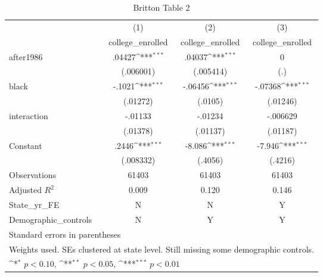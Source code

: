 \begin{table}[htbp]\centering
\def\sym#1{\ifmmode^{#1}\else\(^{#1}\)\fi}
\caption{Britton Table 2}
\begin{tabular}{l*{3}{c}}
\hline\hline
                    &\multicolumn{1}{c}{(1)}&\multicolumn{1}{c}{(2)}&\multicolumn{1}{c}{(3)}\\
                    &\multicolumn{1}{c}{college\_enrolled}&\multicolumn{1}{c}{college\_enrolled}&\multicolumn{1}{c}{college\_enrolled}\\
\hline
after1986           &      .04427\sym{***}&      .04037\sym{***}&           0         \\
                    &   (.006001)         &   (.005414)         &         (.)         \\
[1em]
black               &      -.1021\sym{***}&     -.06456\sym{***}&     -.07368\sym{***}\\
                    &    (.01272)         &     (.0105)         &    (.01246)         \\
[1em]
interaction         &     -.01133         &     -.01234         &    -.006629         \\
                    &    (.01378)         &    (.01137)         &    (.01187)         \\
[1em]
Constant            &       .2446\sym{***}&      -8.086\sym{***}&      -7.946\sym{***}\\
                    &   (.008332)         &     (.4056)         &     (.4216)         \\
\hline
Observations        &       61403         &       61403         &       61403         \\
Adjusted \(R^{2}\)  &       0.009         &       0.120         &       0.146         \\
State\_yr\_FE         &           N         &           N         &           Y         \\
Demographic\_controls&           N         &           Y         &           Y         \\
\hline\hline
\multicolumn{4}{l}{\footnotesize Standard errors in parentheses}\\
\multicolumn{4}{l}{\footnotesize Weights used. SEs clustered at state level. Still missing some demographic controls.}\\
\multicolumn{4}{l}{\footnotesize \sym{*} \(p<0.10\), \sym{**} \(p<0.05\), \sym{***} \(p<0.01\)}\\
\end{tabular}
\end{table}
